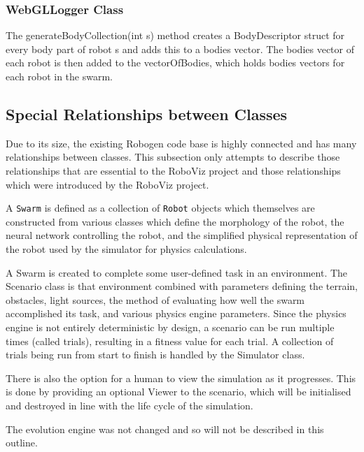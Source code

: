 \documentclass[11pt,a4paper]{article}
\begin{document}
\subsubsection{WebGLLogger Class}
The generateBodyCollection(int s) method creates a BodyDescriptor struct for
every body part of robot s and adds this to a bodies vector. The bodies vector
of each robot is then added to the vectorOfBodies, which holds bodies vectors
for each robot in the swarm.

\subsection{Special Relationships between Classes}
Due to its size, the existing Robogen code base is highly connected and has
many relationships between classes. This subsection only attempts to describe
those relationships that are essential to the RoboViz project and those
relationships which were introduced by the RoboViz project.

A \texttt{Swarm} is defined as a collection of \texttt{Robot} objects which
themselves are constructed from various classes which define the morphology of
the robot, the neural network controlling the robot, and the simplified
physical representation of the robot used by the simulator for physics
calculations.

A Swarm is created to complete some user-defined task in an environment. The
Scenario class is that environment combined with parameters defining the
terrain, obstacles, light sources, the method of evaluating how well the swarm
accomplished its task, and various physics engine parameters. Since the physics
engine is not entirely deterministic by design, a scenario can be run multiple
times (called trials), resulting in a fitness value for each trial. A
collection of trials being run from start to finish is handled by the Simulator
class.

There is also the option for a human to view the simulation as it progresses.
This is done by providing an optional Viewer to the scenario, which will be
initialised and destroyed in line with the life cycle of the simulation.

The evolution engine was not changed and so will not be described in this
outline.
\end{document}
